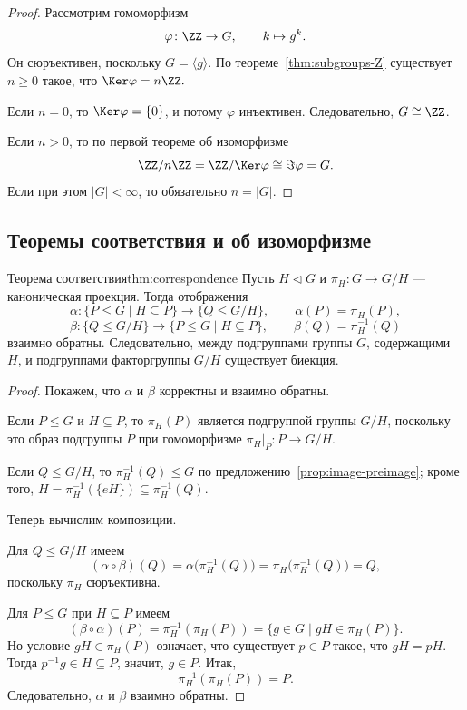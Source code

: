 \begin{proof}
	Рассмотрим гомоморфизм
	\[
	\varphi\colon \ZZ \to G, \qquad k\mapsto g^k.
	\]
	Он сюръективен, поскольку $G=\langle g\rangle$. По теореме~\ref{thm:subgroups-Z} существует $n\ge 0$ такое, что $\Ker\varphi=n\ZZ.$

	Если $n=0$, то $\Ker\varphi=\{0\}$, и потому $\varphi$ инъективен. Следовательно, $G\cong \ZZ$.
	
	Если $n>0$, то по первой теореме об изоморфизме
	\[
	\ZZ/n\ZZ = \ZZ/\Ker\varphi \cong \Im\varphi = G.
	\]
	Если при этом $|G|<\infty$, то обязательно $n=|G|$.
\end{proof}

\subsection{Теоремы соответствия и об изоморфизме}

\begin{Theorem}{Теорема соответствия}{thm:correspondence}
	Пусть $H\triangleleft G$ и $\pi_H\colon G\to G/H$ --- каноническая проекция. Тогда отображения
	\[
	\alpha\colon \{P\le G\mid H\subseteq P\}\to \{Q\le G/H\}, \qquad \alpha(P)=\pi_H(P),
	\]
	\[
	\beta\colon \{Q\le G/H\}\to \{P\le G\mid H\subseteq P\}, \qquad \beta(Q)=\pi_H^{-1}(Q)
	\]
	взаимно обратны. Следовательно, между подгруппами группы $G$, содержащими $H$, и подгруппами факторгруппы $G/H$ существует биекция.
\end{Theorem}

\begin{proof}
	Покажем, что $\alpha$ и $\beta$ корректны и взаимно обратны.
	
	Если $P\le G$ и $H\subseteq P$, то $\pi_H(P)$ является подгруппой группы $G/H$, поскольку это образ подгруппы $P$ при гомоморфизме $\pi_H|_P\colon P\to G/H$.
	
	Если $Q\le G/H$, то $\pi_H^{-1}(Q)\le G$ по предложению~\ref{prop:image-preimage}; кроме того, $H=\pi_H^{-1}(\{eH\})\subseteq \pi_H^{-1}(Q)$.
	
	Теперь вычислим композиции.
	
	Для $Q\le G/H$ имеем
	\[
	(\alpha\circ\beta)(Q)=\alpha\bigl(\pi_H^{-1}(Q)\bigr)=\pi_H\bigl(\pi_H^{-1}(Q)\bigr)=Q,
	\]
	поскольку $\pi_H$ сюръективна.
	
	Для $P\le G$ при $H\subseteq P$ имеем
	\[
	(\beta\circ\alpha)(P)=\pi_H^{-1}(\pi_H(P))=\{g\in G\mid gH\in \pi_H(P)\}.
	\]
	Но условие $gH\in \pi_H(P)$ означает, что существует $p\in P$ такое, что $gH=pH$. Тогда $p^{-1}g\in H\subseteq P$, значит, $g\in P$. Итак,
	\[
	\pi_H^{-1}(\pi_H(P))=P.
	\]
	Следовательно, $\alpha$ и $\beta$ взаимно обратны.
\end{proof}

